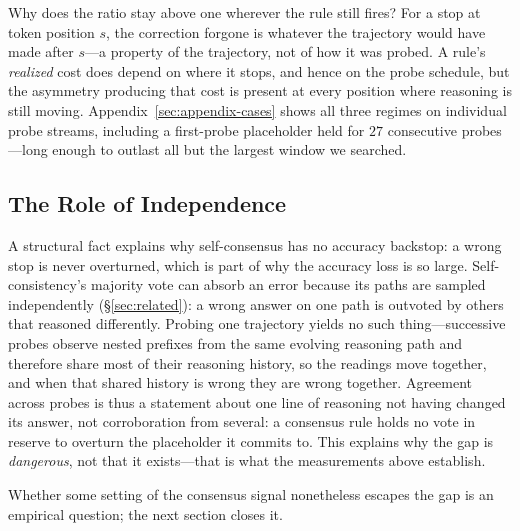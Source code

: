 Why does the ratio stay above one wherever the rule still fires? For a stop at
token position $s$, the correction forgone is whatever the trajectory would
have made after $s$---a property of the trajectory, not of how it was probed.
A rule's \emph{realized} cost does depend on where it stops, and hence on the
probe schedule, but the asymmetry producing that cost is present at every
position where reasoning is still moving.
Appendix~\ref{sec:appendix-cases} shows all three regimes on
individual probe streams, including a first-probe placeholder held for $27$
consecutive probes---long enough to outlast all but the largest window we
searched.

\subsection{The Role of Independence}
\label{sec:mech-independence}
A structural fact explains why self-consensus has no accuracy backstop: a wrong
stop is never overturned, which is part of why the accuracy loss is so
large. Self-consistency's
majority vote can absorb an error because its paths are sampled independently
(\S\ref{sec:related}): a wrong answer on one path is outvoted by others that
reasoned differently. Probing one trajectory yields no such thing---successive
probes observe nested prefixes from the same evolving reasoning path and
therefore share most of their reasoning history, so the readings move together,
and when that shared history is wrong they are wrong together. Agreement across
probes is thus a statement about one line of reasoning not having changed its
answer, not corroboration from several: a consensus rule holds no vote in reserve to
overturn the placeholder it commits to. This explains why the gap is
\emph{dangerous}, not that it exists---that is what the measurements above
establish.

Whether some setting of the consensus signal nonetheless escapes the gap is an
empirical question; the next section closes it.
